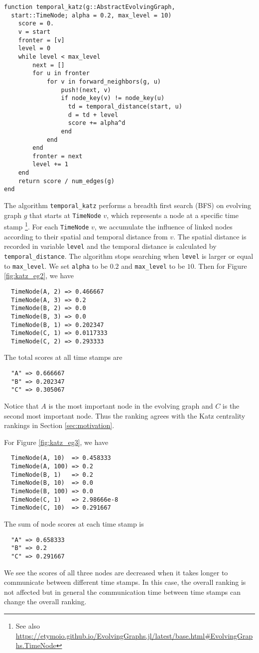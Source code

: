 \documentclass[12pt]{article}
\theoremstyle{definition}
\begin{document}
\begin{lstlisting}[caption={Temporal Katz Centrality of Single Node},label={lst:katz}]
function temporal_katz(g::AbstractEvolvingGraph,
  start::TimeNode; alpha = 0.2, max_level = 10)
    score = 0.
    v = start
    fronter = [v]
    level = 0
    while level < max_level
        next = []
        for u in fronter
            for v in forward_neighbors(g, u)
                push!(next, v)
                if node_key(v) != node_key(u)
                  td = temporal_distance(start, u)
                  d = td + level
                  score += alpha^d
                end
            end
        end
        fronter = next
        level += 1
    end
    return score / num_edges(g)
end
\end{lstlisting}

The algorithm \texttt{temporal\_katz} performs a breadth first search (BFS) on evolving graph $g$ that
starts at \texttt{TimeNode} $v$, which represents a node at a specific time stamp \footnote{See also \url{https://etymoio.github.io/EvolvingGraphs.jl/latest/base.html#EvolvingGraphs.TimeNode}}.
For each \texttt{TimeNode} $v$, we accumulate the influence of linked nodes according to their spatial and temporal
distance from $v$. The spatial distance is recorded in variable \texttt{level} and the temporal distance is calculated by
\texttt{temporal\_distance}. The algorithm stops searching when \texttt{level} is larger or equal to \texttt{max\_level}.
We set \texttt{alpha} to be $0.2$ and \texttt{max\_level} to be $10$. Then
for Figure \ref{fig:katz_eg2}, we have
\begin{lstlisting}
  TimeNode(A, 2) => 0.466667
  TimeNode(A, 3) => 0.2
  TimeNode(B, 2) => 0.0
  TimeNode(B, 3) => 0.0
  TimeNode(B, 1) => 0.202347
  TimeNode(C, 1) => 0.0117333
  TimeNode(C, 2) => 0.293333
\end{lstlisting}
The total scores at all time stamps are
\begin{lstlisting}
  "A" => 0.666667
  "B" => 0.202347
  "C" => 0.305067
\end{lstlisting}
Notice that $A$ is the most important node in the evolving graph and $C$ is the second most important node.
Thus the ranking agrees with the Katz centrality rankings in Section \ref{sec:motivation}.

For Figure \ref{fig:katz_eg3}, we have
\begin{lstlisting}
  TimeNode(A, 10)  => 0.458333
  TimeNode(A, 100) => 0.2
  TimeNode(B, 1)   => 0.2
  TimeNode(B, 10)  => 0.0
  TimeNode(B, 100) => 0.0
  TimeNode(C, 1)   => 2.98666e-8
  TimeNode(C, 10)  => 0.291667
\end{lstlisting}
The sum of node scores at each time stamp is
\begin{lstlisting}
  "A" => 0.658333
  "B" => 0.2
  "C" => 0.291667
\end{lstlisting}
We see the scores of all three nodes are decreased when it takes longer to communicate between different time stamps. In this case, the overall ranking is not affected but in general the communication time between time stamps can change the overall ranking.
\end{document}
